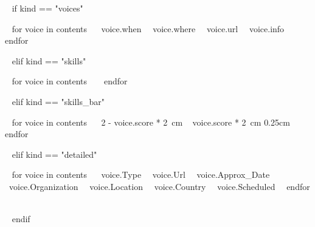 
~{ if kind == "voices" }~


    ~{ for voice in contents }~
        {~{{voice.when}}~}
        {~{{voice.where}}~}
        {~{{voice.url}}~}       
        {~{{voice.info}}~}~{ endfor }~

        
~{ elif kind == "skills" }~

    
    ~{ for voice in contents }~
    ~{ endfor }~
        

~{ elif kind == "skills_bar" }~

    
    ~{ for voice in contents }~
    {~{{2 - voice.score * 2}}~cm}
    {~{{    voice.score * 2}}~cm}
    {0.25cm}~{ endfor }~

~{ elif kind == "detailed" }~


    ~{ for voice in contents }~
        {~{{voice.Type}}~}
        {~{{voice.Url}}~}
        {~{{voice.Approx_Date}}~}
        {~{{voice.Organization}}~}
        {~{{voice.Location}}~}
        {~{{voice.Country}}~}
        {~{{voice.Scheduled}}~}~{ endfor }~


~{ endif }~



